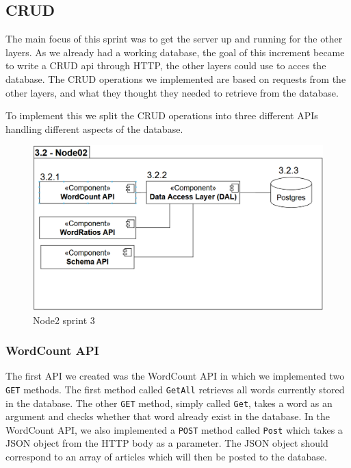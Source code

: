 \subsection{CRUD}

The main focus of this sprint was to get the server up and running for the other layers. 
As we already had a working database, the goal of this increment became to write a CRUD api through HTTP, 
the other layers could use to acces the database.
The CRUD operations we implemented are based on requests from the other layers, and what they thought they needed to retrieve from the database.

To implement this we split the CRUD operations into three different APIs handling different aspects of the database.

\begin{figure} \centering
   \includegraphics{Images/Node02Sprint3.PNG}
   \caption{Node2 sprint 3}
   \label{Node02Sprint3}
\end{figure}

\subsubsection{WordCount API}
The first API we created was the WordCount API in which we implemented two \texttt{GET} methods.
The first method called \texttt{GetAll} retrieves all words currently stored in the database.
The other \texttt{GET} method, simply called \texttt{Get}, takes a word as an argument and checks whether that word already exist in the database.
In the WordCount API, we also implemented a \texttt{POST} method called \texttt{Post} which takes a JSON object from the HTTP body as a parameter. 
The JSON object should correspond to an array of articles which will then be posted to the database. 

